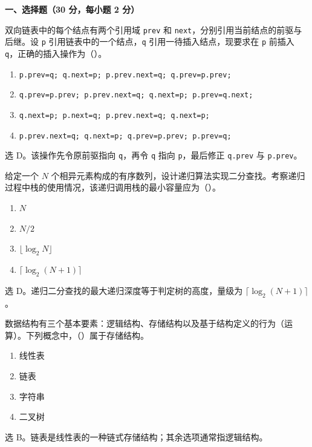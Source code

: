
\textbf{一、选择题（30 分，每小题 2 分）}

\begin{question}
双向链表中的每个结点有两个引用域 \texttt{prev} 和 \texttt{next}，分别引用当前结点的前驱与后继。设 \texttt{p} 引用链表中的一个结点，\texttt{q} 引用一待插入结点，现要求在 \texttt{p} 前插入 \texttt{q}，正确的插入操作为（\quad）。
\begin{enumerate}
  \item \texttt{p.prev=q; q.next=p; p.prev.next=q; q.prev=p.prev;}
  \item \texttt{q.prev=p.prev; p.prev.next=q; q.next=p; p.prev=q.next;}
  \item \texttt{q.next=p; p.next=q; p.prev.next=q; q.next=p;}
  \item \texttt{p.prev.next=q; q.next=p; q.prev=p.prev; p.prev=q;}
\end{enumerate}
\begin{solution}
选 D。该操作先令原前驱指向 \texttt{q}，再令 \texttt{q} 指向 \texttt{p}，最后修正 \texttt{q.prev} 与 \texttt{p.prev}。
\end{solution}
\end{question}

\begin{question}
给定一个 $N$ 个相异元素构成的有序数列，设计递归算法实现二分查找。考察递归过程中栈的使用情况，该递归调用栈的最小容量应为（\quad）。
\begin{enumerate}
  \item $N$
  \item $N/2$
  \item $\lfloor \log_2 N\rfloor$
  \item $\lceil \log_2 (N+1)\rceil$
\end{enumerate}
\begin{solution}
选 D。递归二分查找的最大递归深度等于判定树的高度，量级为 $\lceil\log_2(N+1)\rceil$。
\end{solution}
\end{question}

\begin{question}
数据结构有三个基本要素：逻辑结构、存储结构以及基于结构定义的行为（运算）。下列概念中，（\quad）属于存储结构。
\begin{enumerate}
  \item 线性表
  \item 链表
  \item 字符串
  \item 二叉树
\end{enumerate}
\begin{solution}
选 B。链表是线性表的一种链式存储结构；其余选项通常指逻辑结构。
\end{solution}
\end{question}

